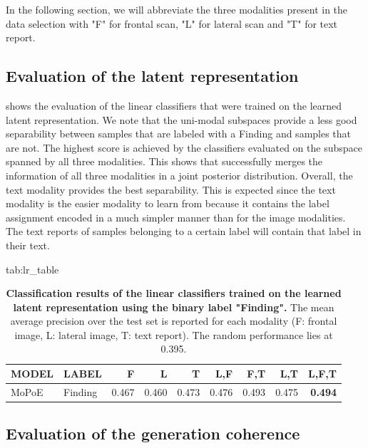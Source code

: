 \documentclass{midl} %
\begin{document}
    In the following section, we will abbreviate the three modalities present in the data selection with "F" for frontal scan, "L" for lateral scan and "T" for text report.
    
    \subsection{Evaluation of the latent representation}
    
     shows the evaluation of the linear classifiers that were trained on the learned latent representation.
    We note that the uni-modal subspaces provide a less good separability between samples that are labeled with a Finding and samples that are not.
    The highest score is achieved by the classifiers evaluated on the subspace spanned by all three modalities.
    This shows that successfully merges the information of all three modalities in a joint posterior distribution.  
    Overall, the text modality provides the best separability.
    This is expected since the text modality is the easier modality to learn from because it contains the label assignment encoded in a much simpler manner than for the image modalities.
    The text reports of samples belonging to a certain label will contain that label in their text.
    
    
    \begin{table}[htbp]
    \floatconts
      {tab:lr_table}%
      {\caption{\textbf{Classification results of the linear classifiers trained on the learned latent representation using the binary label "Finding".} 
      The mean average precision over the test set is reported for each modality (F: frontal image, L: lateral image, T: text report).
      The random performance lies at 0.395.}}%
      {\begin{tabular}{llrrrrrrr}
                MODEL & LABEL   & F     & L     & T     & L,F   & F,T   & L,T   & L,F,T          \\
                \midrule
                MoPoE & Finding & 0.467 & 0.460 & 0.473 & 0.476 & 0.493 & 0.475 & \textbf{0.494} \\
    
            \end{tabular}}
    \end{table}
    
    \subsection{Evaluation of the generation coherence}
    
\end{document}
